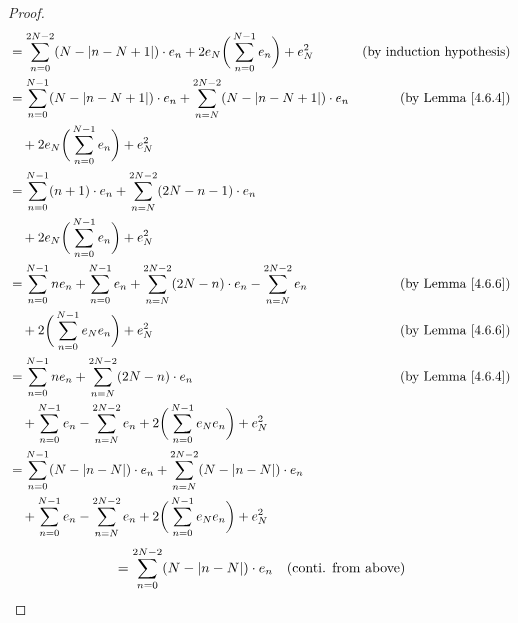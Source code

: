 \begin{proof}
\begin{align*}
         & = \sum_{n = 0}^{2N - 2} (N - \left\lvert n - N + 1\right\rvert) \cdot e_n + 2 e_N \bigg(\sum_{n = 0}^{N - 1} e_n\bigg) + e_N^2                   & \text{(by induction hypothesis)} \\
         & = \sum_{n = 0}^{N - 1} (N - \left\lvert n - N + 1\right\rvert) \cdot e_n + \sum_{n = N}^{2N - 2} (N - \left\lvert n - N + 1\right\rvert) \cdot e_n                 & \text{(by Lemma \ref{4.6.4})}    \\
         & \quad + 2 e_N \bigg(\sum_{n = 0}^{N - 1} e_n\bigg) + e_N^2                                                                                                        \\
         & = \sum_{n = 0}^{N - 1} (n + 1) \cdot e_n + \sum_{n = N}^{2N - 2} (2N - n - 1) \cdot e_n                                                                           \\
         & \quad + 2 e_N \bigg(\sum_{n = 0}^{N - 1} e_n\bigg) + e_N^2                                                                                                        \\
         & = \sum_{n = 0}^{N - 1} n e_n + \sum_{n = 0}^{N - 1} e_n + \sum_{n = N}^{2N - 2} (2N - n) \cdot e_n - \sum_{n = N}^{2N - 2} e_n & \text{(by Lemma \ref{4.6.6})}    \\
         & \quad + 2 \bigg(\sum_{n = 0}^{N - 1} e_N e_n\bigg) + e_N^2                                                                     & \text{(by Lemma \ref{4.6.6})}    \\
         & = \sum_{n = 0}^{N - 1} n e_n + \sum_{n = N}^{2N - 2} (2N - n) \cdot e_n                                                        & \text{(by Lemma \ref{4.6.4})}    \\
         & \quad + \sum_{n = 0}^{N - 1} e_n - \sum_{n = N}^{2N - 2} e_n + 2 \bigg(\sum_{n = 0}^{N - 1} e_N e_n\bigg) + e_N^2                                                 \\
         & = \sum_{n = 0}^{N - 1} (N - \left\lvert n - N\right\rvert) \cdot e_n + \sum_{n = N}^{2N - 2} (N - \left\lvert n - N\right\rvert) \cdot e_n                                                            \\
         & \quad + \sum_{n = 0}^{N - 1} e_n - \sum_{n = N}^{2N - 2} e_n + 2 \bigg(\sum_{n = 0}^{N - 1} e_N e_n\bigg) + e_N^2
    \end{align*}
    \begin{align*}
         & = \sum_{n = 0}^{2N - 2} (N - \abs{n - N}) \cdot e_n                                                               & \text{(conti. from above)}           \\

\end{align*}
\end{proof}
